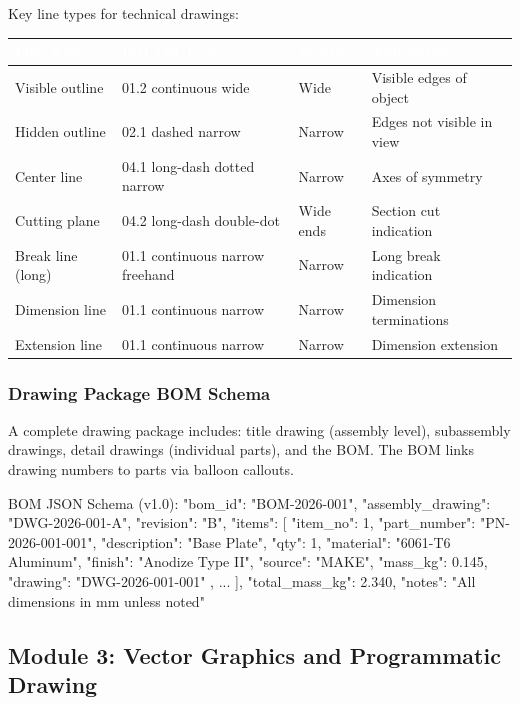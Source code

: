 \documentclass[11pt,letterpaper]{article}
\newcommand{\tableheader}[1]{\textbf{\sffamily\textcolor{white}{#1}}}
\begin{document}
Key line types for technical drawings:
\begin{center}
\begin{tabularx}{\textwidth}{L{3cm}L{3cm}L{2.5cm}X}
\toprule
{}
\tableheader{Line Name} & \tableheader{ISO 128 Type} & \tableheader{Width} & \tableheader{Application} \\
\midrule
Visible outline & 01.2 continuous wide & Wide & Visible edges of object \\
Hidden outline & 02.1 dashed narrow & Narrow & Edges not visible in view \\
Center line & 04.1 long-dash dotted narrow & Narrow & Axes of symmetry \\
Cutting plane & 04.2 long-dash double-dot & Wide ends & Section cut indication \\
Break line (long) & 01.1 continuous narrow freehand & Narrow & Long break indication \\
Dimension line & 01.1 continuous narrow & Narrow & Dimension terminations \\
Extension line & 01.1 continuous narrow & Narrow & Dimension extension \\
\bottomrule
\end{tabularx}
\end{center}

\subsubsection{Drawing Package BOM Schema}

A complete drawing package includes: title drawing (assembly level), subassembly drawings, detail drawings (individual parts), and the BOM. The BOM links drawing numbers to parts via balloon callouts.

\begin{asciibox}
BOM JSON Schema (v1.0):
{
  "bom\_id": "BOM-2026-001",
  "assembly\_drawing": "DWG-2026-001-A",
  "revision": "B",
  "items": [
    {
      "item\_no": 1,
      "part\_number": "PN-2026-001-001",
      "description": "Base Plate",
      "qty": 1,
      "material": "6061-T6 Aluminum",
      "finish": "Anodize Type II",
      "source": "MAKE",
      "mass\_kg": 0.145,
      "drawing": "DWG-2026-001-001"
    },
    ...
  ],
  "total\_mass\_kg": 2.340,
  "notes": "All dimensions in mm unless noted"
}
\end{asciibox}

\subsection{Module 3: Vector Graphics and Programmatic Drawing}
\end{document}
